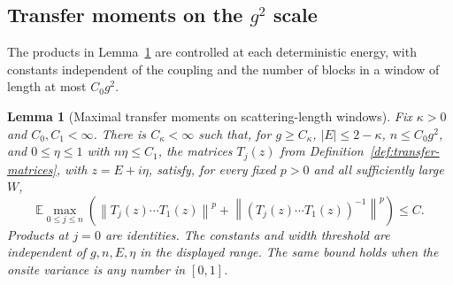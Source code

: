 \documentclass[11pt]{article}
\numberwithin{equation}{section}
\newtheorem{lemma}[theorem]{Lemma}
\theoremstyle{remark}
\newcommand{\E}{\mathbb E}
\newcommand{\norm}[1]{\left\|#1\right\|}
\begin{document}
\subsection{Transfer moments on the \texorpdfstring{$g^2$}{g squared} scale}
\label{sec:uniform-seed}
The products in Lemma~\ref{uvs:lem:transfer-moments} are controlled at each
deterministic energy, with constants independent of the coupling and the
number of blocks in a window of length at most $C_0g^2$.
\begin{lemma}[Maximal transfer moments on scattering-length windows]
\label{uvs:lem:transfer-moments}
Fix $\kappa>0$ and $C_0,C_1<\infty$.
There is $C_\kappa<\infty$ such that, for $g\ge C_\kappa$,
$|E|\le2-\kappa$, $n\le C_0g^2$, and
$0\le\eta\le1$ with $n\eta\le C_1$, the matrices $T_j(z)$ from
Definition~\ref{def:transfer-matrices}, with $z=E+i\eta$, satisfy,
for every fixed $p>0$ and all sufficiently large $W$,
\begin{equation}\label{uvs:eq:transfer-moments}
 \E\max_{0\le j\le n}
 \left(\norm{T_j(z)\cdots T_1(z)}^p+
       \norm{(T_j(z)\cdots T_1(z))^{-1}}^p\right)
 \le C.
\end{equation}
Products at $j=0$ are identities. The constants and width threshold
are independent of $g,n,E,\eta$ in the displayed range. The same
bound holds when the onsite variance is any number in $[0,1]$.
\end{lemma}
\end{document}
